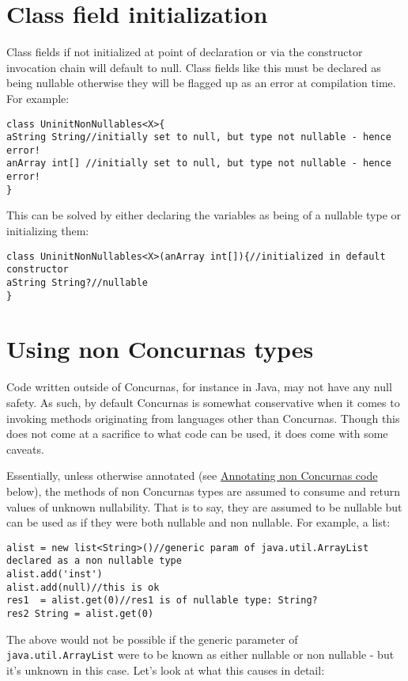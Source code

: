 \documentclass[conc-doc]{subfiles}
\begin{document}
\section{Class field initialization}
Class fields if not initialized at point of declaration or via the constructor invocation chain will default to null. Class fields like this must be declared as being nullable otherwise they will be flagged up as an error at compilation time. For example:
\begin{lstlisting}
class UninitNonNullables<X>{
aString String//initially set to null, but type not nullable - hence error!
anArray int[] //initially set to null, but type not nullable - hence error!
}
\end{lstlisting}

This can be solved by either declaring the variables as being of a nullable type or initializing them:

\begin{lstlisting}
class UninitNonNullables<X>(anArray int[]){//initialized in default constructor
aString String?//nullable
}
\end{lstlisting}

\section{Using non Concurnas types}
Code written outside of Concurnas, for instance in Java, may not have any null safety. As such, by default Concurnas is somewhat conservative when it comes to invoking methods originating from languages other than Concurnas. Though this does not come at a sacrifice to what code can be used, it does come with some caveats.

Essentially, unless otherwise annotated (see \hyperref[subsubsec:annotatenonconc]{Annotating non Concurnas code} below), the methods of non Concurnas types are assumed to consume and return values of unknown nullability. That is to say, they are assumed to be nullable but can be used as if they were both nullable and non nullable. For example, a list:

\begin{lstlisting}
alist = new list<String>()//generic param of java.util.ArrayList declared as a non nullable type
alist.add('inst')
alist.add(null)//this is ok
res1  = alist.get(0)//res1 is of nullable type: String?
res2 String = alist.get(0)
\end{lstlisting}

The above would not be possible if the generic parameter of \lstinline{java.util.ArrayList} were to be known as either nullable or non nullable - but it's unknown in this case. Let's look at what this causes in detail:
\end{document}
